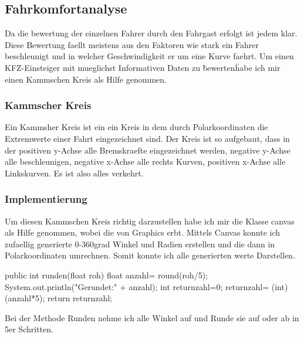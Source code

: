 \subsection{Fahrkomfortanalyse}

Da die bewertung der einzelnen Fahrer durch den Fahrgast erfolgt ist jedem klar.
Diese Bewertung faellt meistens aus den Faktoren wie stark ein Fahrer beschleunigt und in welcher Geschwindigkeit er um eine Kurve faehrt.
Um einen KFZ-Einsteiger mit mueglichst Informativen Daten zu \"bewerten\" habe ich mir einen Kammschen Kreis als Hilfe genommen.

\subsubsection{Kammscher Kreis }
Ein Kammsher Kreis ist ein ein Kreis in dem durch Polarkoordinaten die Extremwerte einer Fahrt eingezeichnet sind.
Der Kreis ist so aufgebaut, dass in der positiven y-Achse alle Bremskraefte eingezeichnet werden, negative y-Achse alle beschleunigen,
negative x-Achse alle rechts Kurven, positiven x-Achse alle Linkskurven.
Es ist also alles verkehrt.

\subsubsection{Implementierung}
Um diesen Kammschen Kreis richtig darzustellen habe ich mir die Klasse canvas als Hilfe genommen, wobei die von Graphics erbt.
Mittels Canvas konnte ich zufaellig generierte 0-360grad Winkel und Radien erstellen und die dann in Polarkoordinaten umrechnen.
Somit konnte ich alle generierten werte Darstellen. 

public int runden(float roh){
	float anzahl= round(roh/5);
	System.out.println("Gerundet:" + anzahl);
	int returnzahl=0;
	returnzahl= (int) (anzahl*5);
	return returnzahl;
}

Bei der Methode Runden nehme ich alle Winkel auf und Runde sie auf oder ab in 5er Schritten.



\clearpage %